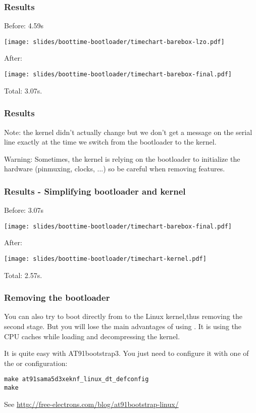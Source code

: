 \begin{frame}
\frametitle{Results}
Before: 4.59s
\begin{center}
    \texttt{[image: slides/boottime-bootloader/timechart-barebox-lzo.pdf]}
\end{center}
After:
\begin{center}
    \texttt{[image: slides/boottime-bootloader/timechart-barebox-final.pdf]}
\end{center}
Total: 3.07s.
\end{frame}

\begin{frame}
\frametitle{Results}
Note: the kernel didn't actually change but we don't get a message on
the serial line exactly at the time we switch from the bootloader to
the kernel.

Warning: Sometimes, the kernel is relying on the bootloader to
initialize the hardware (pinmuxing, clocks, ...) so be careful when
removing features.
\end{frame}

\begin{frame}
\frametitle{Results - Simplifying bootloader and kernel}

Before: 3.07s
\begin{center}
    \texttt{[image: slides/boottime-bootloader/timechart-barebox-final.pdf]}
\end{center}
After:
\begin{center}
    \texttt{[image: slides/boottime-bootloader/timechart-kernel.pdf]}
\end{center}
Total: 2.57s.
\end{frame}


\begin{frame}[fragile]
\frametitle{Removing the bootloader}
You can also try to boot directly from  to the
Linux kernel,thus removing the second stage. But you will lose the
main advantages of using .  It is using the CPU caches
while loading and decompressing the kernel.

It is quite easy with AT91bootstrap3. You just need to configure it
with one of the  or  configuration:
\begin{block}{}
\begin{verbatim}
make at91sama5d3xeknf_linux_dt_defconfig
make
\end{verbatim}
\end{block}
See \url{http://free-electrons.com/blog/at91bootstrap-linux/}
\end{frame}


